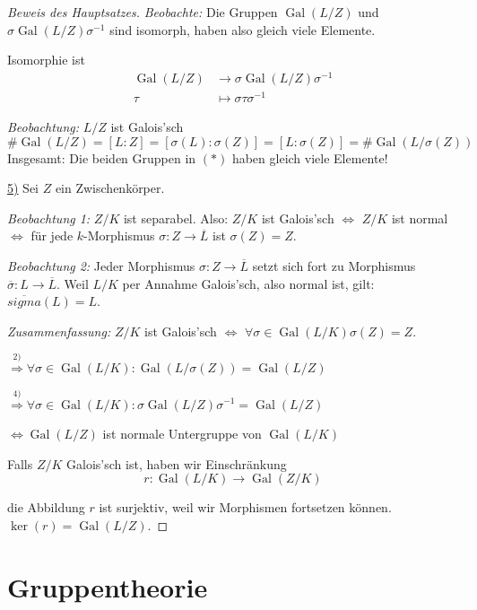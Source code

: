 \documentclass[a4paper,12pt,numbers=noenddot,parskip=full]{scrartcl}
\newcommand{\heading}{\underline}
\DeclareMathOperator{\Gal}{Gal}
\theoremstyle{dotless}
\theoremstyle{remark}
\begin{document}
\begin{proof}[Beweis des Hauptsatzes]
		\textit{Beobachte:} Die Gruppen $\Gal(L/Z)$ und $\sigma \Gal(L/Z) \sigma^{-1}$ sind isomorph, haben also gleich viele Elemente.
		
		Isomorphie ist
		\begin{align*}
			\Gal(L/Z) &\to \sigma \Gal(L/Z) \sigma^{-1} \\
			\tau &\mapsto \sigma \tau \sigma^{-1}
		\end{align*}
		
		\textit{Beobachtung:} $L/Z$ ist Galois'sch
		\begin{equation*}
			\#\Gal(L/Z) = [L:Z] = [\sigma(L): \sigma(Z)] = [L: \sigma(Z)] = \#\Gal(L/\sigma(Z))
		\end{equation*}
		Insgesamt: Die beiden Gruppen in $(*)$ haben gleich viele Elemente!
		
		\heading{5)} Sei $Z$ ein Zwischenkörper.
		
		\textit{Beobachtung 1:} $Z/K$ ist separabel. Also: $Z/K$ ist Galois'sch $\Leftrightarrow$ $Z/K$ ist normal $\Leftrightarrow$ für jede $k$-Morphismus $\sigma: Z \to \overline{L}$ ist $\sigma(Z) = Z$.
		
		\textit{Beobachtung 2:} Jeder Morphismus $\sigma: Z \to \overline{L}$ setzt sich fort zu Morphismus $\overline{\sigma}: L \to \overline{L}$. Weil $L/K$ per Annahme Galois'sch, also normal ist, gilt: $\overline{sigma}(L) = L$.
		
		\textit{Zusammenfassung:} $Z/K$ ist Galois'sch $\Leftrightarrow$ $\forall \sigma \in \Gal(L/K) \sigma(Z) = Z$.
		
		$\overset{2)}{\Rightarrow} \forall \sigma \in \Gal(L/K): \Gal(L/\sigma(Z)) = \Gal(L/Z)$
		
		$\overset{4)}{\Rightarrow} \forall \sigma \in \Gal(L/K): \sigma \Gal(L/Z) \sigma^{-1} = \Gal(L/Z)$
		
		$\Leftrightarrow \Gal(L/Z)$ ist normale Untergruppe von $\Gal(L/K)$
		
		Falls $Z/K$ Galois'sch ist, haben wir Einschränkung
		\begin{equation*}
			r: \Gal(L/K) \to \Gal(Z/K)
		\end{equation*}
		
		die Abbildung $r$ ist surjektiv, weil wir Morphismen fortsetzen können. $\ker(r) = \Gal(L/Z)$.
 		
	\end{proof}

	\section{Gruppentheorie}
	
\end{document}
